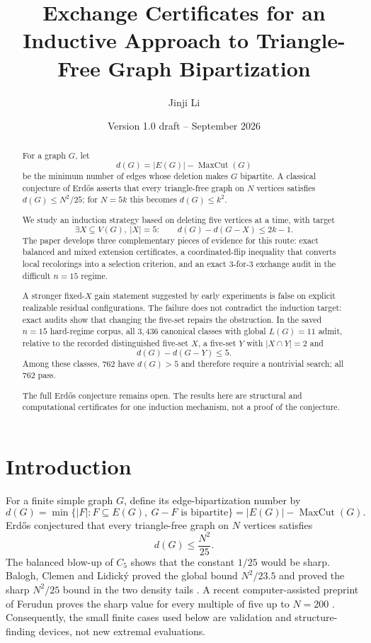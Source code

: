 \documentclass[11pt]{article}
\title{Exchange Certificates for an Inductive Approach to Triangle-Free Graph Bipartization}
\author{Jinji Li}
\date{Version 1.0 draft -- September 2026}
\newcommand{\mc}{\operatorname{MaxCut}}
\newcommand{\dd}{d}
\begin{document}
\maketitle

\begin{abstract}
For a graph $G$, let
\[
\dd(G)=|E(G)|-\mc(G)
\]
be the minimum number of edges whose deletion makes $G$ bipartite.
A classical conjecture of Erd\H{o}s asserts that every triangle-free graph
on $N$ vertices satisfies $\dd(G)\le N^2/25$; for $N=5k$ this becomes
$\dd(G)\le k^2$.

We study an induction strategy based on deleting five vertices at a time,
with target
\[
\exists X\subseteq V(G),\ |X|=5:\qquad
\dd(G)-\dd(G-X)\le 2k-1.
\]
The paper develops three complementary pieces of evidence for this route:
exact balanced and mixed extension certificates, a coordinated-flip
inequality that converts local recolorings into a selection criterion, and
an exact 3-for-3 exchange audit in the difficult $n=15$ regime.

A stronger fixed-$X$ gain statement suggested by early experiments is
false on explicit realizable residual configurations.  The failure does
not contradict the induction target: exact audits show that changing the
five-set repairs the obstruction.  In the saved $n=15$ hard-regime corpus,
all $3{,}436$ canonical classes with global $L(G)=11$ admit, relative to the
recorded distinguished five-set $X$, a five-set $Y$ with $|X\cap Y|=2$ and
\[
\dd(G)-\dd(G-Y)\le 5.
\]
Among these classes, $762$ have $\dd(G)>5$ and therefore require a
nontrivial search; all $762$ pass.

The full Erd\H{o}s conjecture remains open.  The results here are
structural and computational certificates for one induction mechanism,
not a proof of the conjecture.
\end{abstract}

\section{Introduction}

For a finite simple graph $G$, define its edge-bipartization number by
\[
\dd(G)=\min\{|F|:F\subseteq E(G),\ G-F\text{ is bipartite}\}
      =|E(G)|-\mc(G).
\]
Erd\H{o}s conjectured that every triangle-free graph on $N$ vertices
satisfies
\[
\dd(G)\le \frac{N^2}{25}.
\]
The balanced blow-up of $C_5$ shows that the constant $1/25$ would be
sharp.  Balogh, Clemen and Lidick\'y proved the global bound
$N^2/23.5$ and proved the sharp $N^2/25$ bound in the two density tails
\cite{BCL}.  A recent computer-assisted preprint of Ferudun proves the
sharp value for every multiple of five up to $N=200$ \cite{Ferudun}.
Consequently, the small finite cases used below are validation and
structure-finding devices, not new extremal evaluations.
\end{document}
